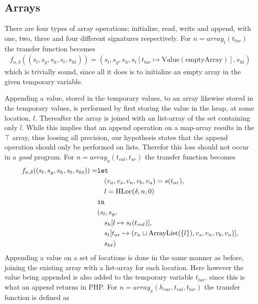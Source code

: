 \subsection{Arrays}

There are four types of array operations; initialize, read, write and append, with one, two, three and four different signatures respectively. For $n = \mathit{array}_i(t_{tar})$ the transfer function becomes
\begin{align}
f_{n,\delta}((s_l, s_g, s_h, s_t, s_{ht})) = (s_l, s_g, s_h, s_t[t_{tar}\mapsto \text{Value}(\text{emptyArray})], s_{ht})
\end{align}
which is trivially sound, since all it does is to initialize an empty array in the given temporary variable.

Appending a value, stored in the temporary values, to an array likewise stored in the temporary values, is performed by first storing the value in the heap, at some location, $l$. Thereafter the array is joined with an list-array of the set containing only $l$. While this implies that an append operation on a map-array results in the $\top$ array, thus loosing all precision, our hypothesis states that the append operation should only be performed on lists. Therefor this loss should not occur in a \emph{good} program. For $n = \mathit{array}_a(t_{val},t_{ar})$ the transfer function becomes
\begin{align}
f_{n,\delta}((s_l, s_g, s_h, s_t, s_{ht})) = & \texttt{let } \notag\\
                                    & \quad (v_a,v_s,v_n,v_b,v_u) = s(t_{ar}), \notag\\
                                    & \quad l = \text{HLoc}(\delta, n, 0)\notag\\
                                    & \texttt{in } \notag\\
                                    &(s_l,s_g,\notag\\
                                    &\quad s_h[l\mapsto s_t(t_{val})], \notag\\
                                    &\quad s_t[t_{ar} \mapsto (v_a \sqcup \text{ArrayList}(\{l\}),v_s, v_n, v_b, v_u)],\notag\\
                                    &\quad s_{ht})
\end{align}
Appending a value on a set of locations is done in the same manner as before, joining the existing array with a list-array for each location. Here however the value being appended is also added to the temporary variable $t_{tar}$, since this is what an append returns in PHP. For $n = \mathit{array}_a(h_{var}, t_{val},t_{tar})$ the transfer function is defined as
